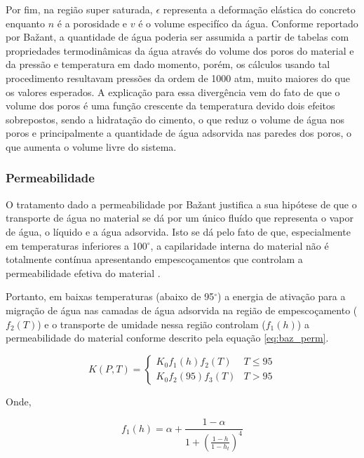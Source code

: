 Por fim, na região super saturada, $\epsilon$ representa a deformação elástica
do concreto enquanto $n$ é a porosidade e $v$ é o volume especifíco da água.
Conforme reportado por Ba\v{z}ant, a quantidade de água poderia ser assumida a
partir de tabelas com propriedades termodinâmicas da água através do volume dos
poros do material e da pressão e temperatura em dado momento, porém, os cálculos
usando tal procedimento resultavam pressões da ordem de 1000 atm, muito maiores
do que os valores esperados. A explicação para essa divergência vem do fato de
que o volume dos poros é uma função crescente da temperatura devido dois efeitos
sobrepostos, sendo a hidratação do cimento, o que reduz o volume de água nos
poros e principalmente a quantidade de água adsorvida nas paredes dos
poros, o que aumenta o volume livre do sistema.

\subsubsection{Permeabilidade}
O tratamento dado a permeabilidade por Ba\v{z}ant justifica a sua hipótese de
que o transporte de água no material se dá por um único fluído que representa o
vapor de água, o líquido e a água adsorvida. Isto se dá pelo fato de que,
especialmente em temperaturas inferiores a 100$^{\circ}$, a capilaridade interna
do material não é totalmente contínua apresentando empescoçamentos que controlam
a permeabilidade efetiva do material \cite{bazant1978}.

Portanto, em baixas temperaturas (abaixo de 95$^{\circ}$) a energia de ativação
para a migração de água nas camadas de água adsorvida na região de
empescoçamento ($f_2(T)$) e o transporte de umidade nessa região controlam
($f_1(h)$) a permeabilidade do material conforme descrito pela equação
\ref{eq:baz_perm}.
    
\begin{equation}
  \label{eq:baz_perm}
  K(P, T) =
  \begin{cases} 
    K_0 f_1(h) f_2(T) & T \leq 95 \\
    K_0 f_2(95) f_3(T) & T > 95
  \end{cases}
\end{equation}

Onde,

\begin{equation}
  \label{eq:f1}
  f_1(h) = \alpha + \frac{1-\alpha}{1+\left(\frac{1-h}{1-h_t}\right)^4} 
\end{equation}

